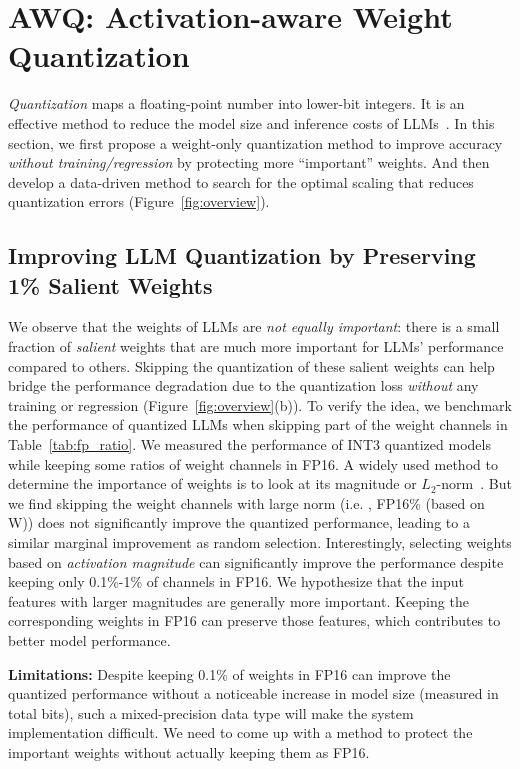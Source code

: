 \section{AWQ: Activation-aware Weight Quantization}

\emph{Quantization} maps a floating-point number into lower-bit integers. It is an effective method to reduce the model size and inference costs of LLMs~\cite{dettmers2022llmint8, frantar2022gptq, zeroquant, xiao2022smoothquant}. In this section, we first propose a weight-only quantization method to improve accuracy \emph{without training/regression} by protecting more ``important'' weights. And then develop a data-driven method to search for the optimal scaling that reduces quantization errors (Figure~\ref{fig:overview}). 

\subsection{Improving LLM Quantization by Preserving 1\% Salient Weights}

\renewcommand \arraystretch{1.05}

We observe that the weights of LLMs are \emph{not equally important}: there is a small fraction of \emph{salient} weights that are much more important for LLMs' performance compared to others. Skipping the quantization of these salient weights can help bridge the performance degradation due to the quantization loss \emph{without} any training or regression (Figure~\ref{fig:overview}(b)).
To verify the idea, we benchmark the performance of quantized LLMs when skipping part of the weight channels in Table~\ref{tab:fp_ratio}. We measured the performance of INT3 quantized models while keeping some ratios of weight channels in FP16. A widely used method to determine the importance of weights is to look at its magnitude or $L_2$-norm~\cite{han2015learning, frankle2018lottery}. But we find skipping the weight channels with large norm (i.e. , FP16\% (based on W)) does not significantly improve the quantized performance, leading to a similar marginal improvement as random selection. Interestingly, selecting weights based on \emph{activation magnitude} can significantly improve the performance despite keeping only 0.1\%-1\% of channels in FP16. We hypothesize that the input features with larger magnitudes are generally more important. Keeping the corresponding weights in FP16 can preserve those features, which contributes to better model performance. 

\textbf{Limitations: } Despite keeping 0.1\% of weights in FP16 can improve the quantized performance without a noticeable increase in model size (measured in total bits), such a mixed-precision data type will make the system implementation difficult. We need to come up with a method to protect the important weights without actually keeping them as FP16. 

